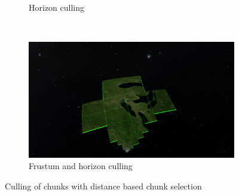 \begin{figure}[h]
\begin{subfigure}[t]{0.4\textwidth}
        \caption{Horizon culling}
    \end{subfigure}
    ~
    \begin{subfigure}[t]{0.4\textwidth}
        \includegraphics[width=\textwidth]{figures/results/culling/dhf.png}
        \caption{Frustum and horizon culling}
    \end{subfigure}
    \caption{Culling of chunks with distance based chunk selection}
    \label{fig:cullingd}
\end{figure}

